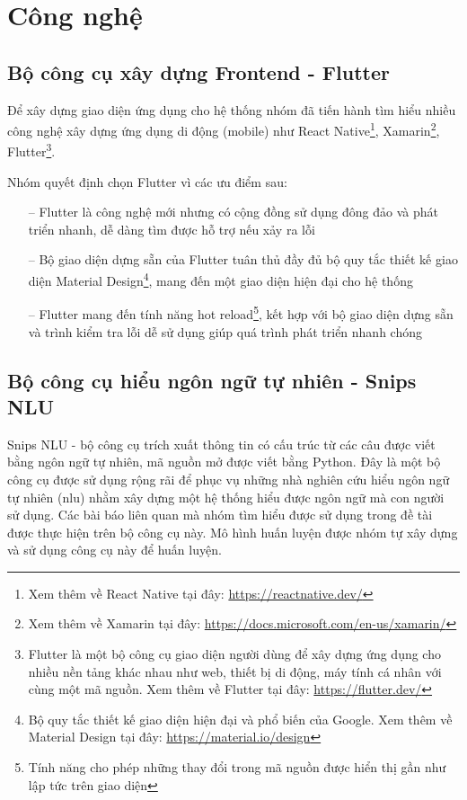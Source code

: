 \section{Công nghệ}

\subsection{Bộ công cụ xây dựng Frontend - Flutter}
Để xây dựng giao diện ứng dụng cho hệ thống nhóm đã tiến hành tìm hiểu nhiều công nghệ xây dựng ứng dụng di động (mobile) như React Native\footnote{Xem thêm về React Native tại đây: \url{https://reactnative.dev/}}, Xamarin\footnote{Xem thêm về Xamarin tại đây: \url{https://docs.microsoft.com/en-us/xamarin/}}, Flutter\footnote{Flutter là một bộ công cụ giao diện người dùng để xây dựng ứng dụng cho nhiều nền tảng khác nhau như web, thiết bị di động, máy tính cá nhân với cùng một mã nguồn. Xem thêm về Flutter tại đây: \url{https://flutter.dev/}}.

Nhóm quyết định chọn Flutter vì các ưu điểm sau:
\begin{itemize}
    \item[--] Flutter là công nghệ mới nhưng có cộng đồng sử dụng đông đảo và phát triển nhanh, dễ dàng tìm được hỗ trợ nếu xảy ra lỗi
    \item[--] Bộ giao diện dựng sẵn của Flutter tuân thủ đầy đủ bộ quy tắc thiết kế giao diện Material Design\footnote{Bộ quy tắc thiết kế giao diện hiện đại và phổ biến của Google. Xem thêm về Material Design tại đây: \url{https://material.io/design}}, mang đến một giao diện hiện đại cho hệ thống
    \item[--] Flutter mang đến tính năng hot reload\footnote{Tính năng cho phép những thay đổi trong mã nguồn được hiển thị gần như lập tức trên giao diện}, kết hợp với bộ giao diện dựng sẵn và trình kiểm tra lỗi dễ sử dụng giúp quá trình phát triển nhanh chóng
\end{itemize}

\subsection{Bộ công cụ hiểu ngôn ngữ tự nhiên - Snips NLU}
Snips NLU - bộ công cụ trích xuất thông tin có cấu trúc từ các câu được viết bằng ngôn ngữ tự nhiên, mã nguồn mở được viết bằng Python.
Đây là một bộ công cụ được sử dụng rộng rãi để phục vụ những nhà nghiên cứu hiểu ngôn ngữ tự nhiên (\ac{nlu}) nhằm xây dựng một hệ thống hiểu được ngôn ngữ mà con người sử dụng. Các bài báo liên quan mà nhóm tìm hiểu được sử dụng trong đề tài được thực hiện trên bộ công cụ này. Mô hình huấn luyện được nhóm tự xây dựng và sử dụng công cụ này để huấn luyện.

